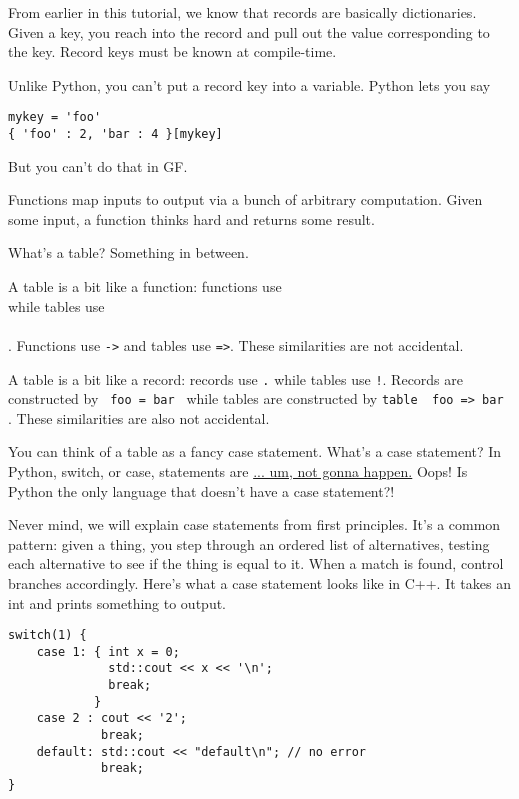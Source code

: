 \documentclass{scrartcl}
\begin{document}
From earlier in this tutorial, we know that records are basically dictionaries. Given a key, you reach into the record and pull out the value corresponding to the key. Record keys must be known at compile-time.

Unlike Python, you can't put a record key into a variable. Python lets you say

\begin{verbatim}
mykey = 'foo'
{ 'foo' : 2, 'bar : 4 }[mykey]
\end{verbatim}

But you can't do that in GF.

Functions map inputs to output via a bunch of arbitrary computation. Given some input, a function thinks hard and returns some result.

What's a table? Something in between.

A table is a bit like a function: functions use \texttt{\\} while tables use \texttt{\\\\}. Functions use \texttt{->} and tables use \texttt{=>}. These similarities are not accidental.

A table is a bit like a record: records use \texttt{.} while tables use \texttt{!}. Records are constructed by \texttt{{ foo = bar }} while tables are constructed by \texttt{table { foo => bar }}. These similarities are also not accidental.

You can think of a table as a fancy case statement. What's a case statement? In Python, switch, or case, statements are \href{https://www.python.org/dev/peps/pep-3103/}{... um, not gonna happen.} Oops! Is Python the only language that doesn't have a case statement?!

Never mind, we will explain case statements from first principles. It's a common pattern: given a thing, you step through an ordered list of alternatives, testing each alternative to see if the thing is equal to it. When a match is found, control branches accordingly. Here's what a case statement looks like in C++. It takes an int and prints something to output.

\begin{verbatim}
switch(1) {
    case 1: { int x = 0;
              std::cout << x << '\n';
              break;
            }
    case 2 : cout << '2';
             break;
    default: std::cout << "default\n"; // no error
             break;
}
\end{verbatim}
\end{document}

